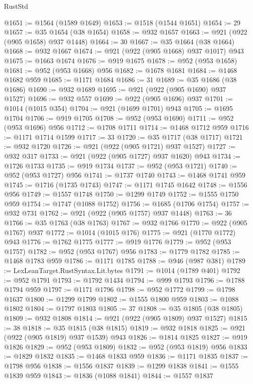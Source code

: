 \begin{lexlean}{RustStd}
\begin{coremodule}
@1651 := @1564 (@1589 @1649)
@1653 := @1518 (@1544 @1651)
@1654 := 29
@1657 := @35 @1654 (@38 @1654)
@1658 := @932 @1657
@1663 := @921 (@922 (@905 @1658) @937 @1448)
@1664 := 30
@1667 := @35 @1664 (@38 @1664)
@1668 := @932 @1667
@1674 := @921 (@922 (@905 @1668) @937 @1017) @943
@1675 := @1663 @1674
@1676 := @919 @1675
@1678 := @952 (@953 @1658)
@1681 := @952 (@953 @1668) @956
@1682 := @1678 @1681
@1684 := @1468 @1682 @959
@1685 := @1171 @1684
@1686 := 31
@1689 := @35 @1686 (@38 @1686)
@1690 := @932 @1689
@1695 := @921 (@922 (@905 @1690) @937 @1527)
@1696 := @932 @557
@1699 := @922 (@905 @1696) @937
@1701 := @1014 (@1015 @354)
@1704 := @921 (@1699 @1701) @943
@1705 := @1695 @1704
@1706 := @919 @1705
@1708 := @952 (@953 @1690)
@1711 := @952 (@953 @1696) @956
@1712 := @1708 @1711
@1714 := @1468 @1712 @959
@1716 := @1171 @1714 @1599
@1717 := 33
@1720 := @35 @1717 (@38 @1717)
@1721 := @932 @1720
@1726 := @921 (@922 (@905 @1721) @937 @1527)
@1727 := @932 @317
@1733 := @921 (@922 (@905 @1727) @937 @1620) @943
@1734 := @1726 @1733
@1735 := @919 @1734
@1737 := @952 (@953 @1721)
@1740 := @952 (@953 @1727) @956
@1741 := @1737 @1740
@1743 := @1468 @1741 @959
@1745 := @1716 (@1735 @1743)
@1747 := @1171 @1745 @1642
@1748 := @1556 @956
@1749 := @1557 @1748
@1750 := @1299 @1749
@1752 := @1555 @1750 @959
@1754 := @1747 (@1088 @1752)
@1756 := @1685 (@1706 @1754)
@1757 := @932 @731
@1762 := @921 (@922 (@905 @1757) @937 @1448)
@1763 := 36
@1766 := @35 @1763 (@38 @1763)
@1767 := @932 @1766
@1770 := @922 (@905 @1767) @937
@1772 := @1014 (@1015 @176)
@1775 := @921 (@1770 @1772) @943
@1776 := @1762 @1775
@1777 := @919 @1776
@1779 := @952 (@953 @1757)
@1782 := @952 (@953 @1767) @956
@1783 := @1779 @1782
@1785 := @1468 @1783 @959
@1786 := @1171 @1785
@1788 := @946 (@987 @381)
@1789 := LexLeanTarget.RustSyntax.Lit.bytes
@1791 := @1014 (@1789 @401)
@1792 := @952 @1791
@1793 := @1792 @1434
@1794 := @999 @1793
@1796 := @1788 @1794 @959
@1797 := @1171 @1796
@1798 := @952 @1772
@1799 := @1798 @1637
@1800 := @1299 @1799
@1802 := @1555 @1800 @959
@1803 := @1088 @1802
@1804 := @1797 @1803
@1805 := 37
@1808 := @35 @1805 (@38 @1805)
@1809 := @932 @1808
@1814 := @921 (@922 (@905 @1809) @937 @1527)
@1815 := 38
@1818 := @35 @1815 (@38 @1815)
@1819 := @932 @1818
@1825 := @921 (@922 (@905 @1819) @937 @1539) @943
@1826 := @1814 @1825
@1827 := @919 @1826
@1829 := @952 (@953 @1809)
@1832 := @952 (@953 @1819) @956
@1833 := @1829 @1832
@1835 := @1468 @1833 @959
@1836 := @1171 @1835
@1837 := @1798 @956
@1838 := @1556 @1837
@1839 := @1299 @1838
@1841 := @1555 @1839 @959
@1843 := @1836 (@1088 @1841)
@1844 := @1557 @1837

\end{coremodule}
\end{lexlean}
